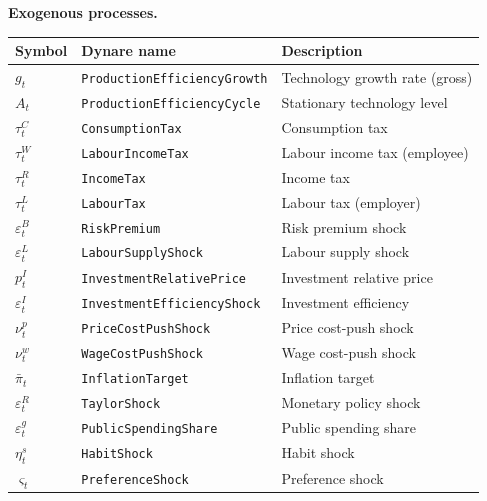 \documentclass[11pt,a4paper]{article}
\newcommand{\bbar}[1]{\bar{#1}}
\begin{document}
\noindent\textbf{Exogenous processes.}
\begin{center}
\begin{tabular}{lll}
\toprule
\textbf{Symbol} & \textbf{Dynare name} & \textbf{Description} \\
\midrule
$g_t$ & \texttt{ProductionEfficiencyGrowth} & Technology growth rate (gross) \\
$A_t$ & \texttt{ProductionEfficiencyCycle} & Stationary technology level \\
$\tau^C_t$ & \texttt{ConsumptionTax} & Consumption tax \\
$\tau^W_t$ & \texttt{LabourIncomeTax} & Labour income tax (employee) \\
$\tau^R_t$ & \texttt{IncomeTax} & Income tax \\
$\tau^L_t$ & \texttt{LabourTax} & Labour tax (employer) \\
$\varepsilon^B_t$ & \texttt{RiskPremium} & Risk premium shock \\
$\varepsilon^L_t$ & \texttt{LabourSupplyShock} & Labour supply shock \\
$p^I_t$ & \texttt{InvestmentRelativePrice} & Investment relative price \\
$\varepsilon^I_t$ & \texttt{InvestmentEfficiencyShock} & Investment efficiency \\
$\nu^p_t$ & \texttt{PriceCostPushShock} & Price cost-push shock \\
$\nu^w_t$ & \texttt{WageCostPushShock} & Wage cost-push shock \\
$\bbar\pi_t$ & \texttt{InflationTarget} & Inflation target \\
$\varepsilon^R_t$ & \texttt{TaylorShock} & Monetary policy shock \\
$\varepsilon^g_t$ & \texttt{PublicSpendingShare} & Public spending share \\
$\eta^s_t$ & \texttt{HabitShock} & Habit shock \\
$\varsigma_t$ & \texttt{PreferenceShock} & Preference shock \\
\bottomrule
\end{tabular}
\end{center}
\end{document}
